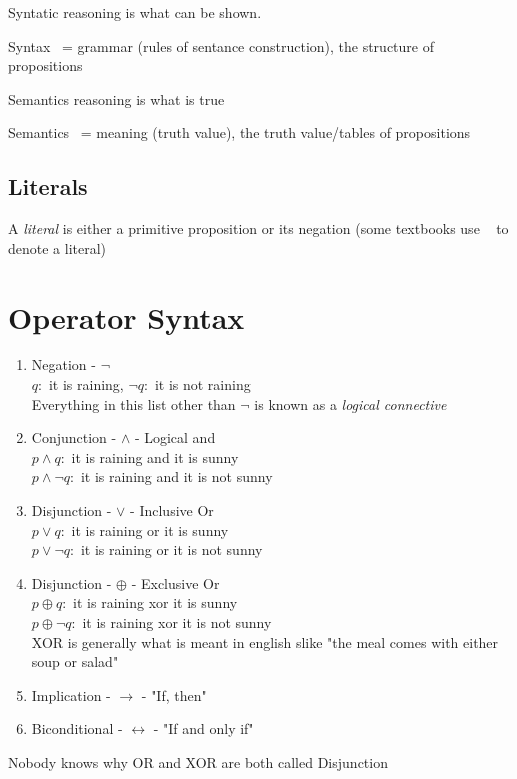 \documentclass[12pt]{article}
\begin{document}
Syntatic reasoning is what can be shown. 

Syntax ~= grammar (rules of sentance construction), the structure of propositions

Semantics reasoning is what is true

Semantics ~= meaning (truth value), the truth value/tables of propositions

\subsection{Literals}

A \textit{literal} is either a primitive proposition or its negation (some
textbooks use ~ to denote a literal)

\section{Operator Syntax}

\begin{enumerate}
  \item Negation - $\neg$ \\
    $q:$ it is raining, $\neg q:$ it is not raining\\
  Everything in this list other than $\neg $  is known as a \textit{logical connective}
  \item Conjunction - $\land$ - Logical and\\
    $p \land q:$ it is raining and it is sunny \\
    $p \land \neg q:$ it is raining and it is not sunny
  \item Disjunction - $\lor$ - Inclusive Or\\
    $p \lor q:$ it is raining or it is sunny \\
    $p \lor \neg q:$ it is raining or it is not sunny
  \item Disjunction - $\oplus$ - Exclusive Or\\
    $p \oplus q:$ it is raining xor it is sunny \\
    $p \oplus \neg q:$ it is raining xor it is not sunny\\
    XOR is generally what is meant in english s\entences like "the meal comes
    with either soup or salad"
  \item Implication - $\to$ - "If, then"
  \item Biconditional - $\leftrightarrow$ - "If and only if"
\end{enumerate}

Nobody knows why OR and XOR are both called Disjunction
\end{document}
